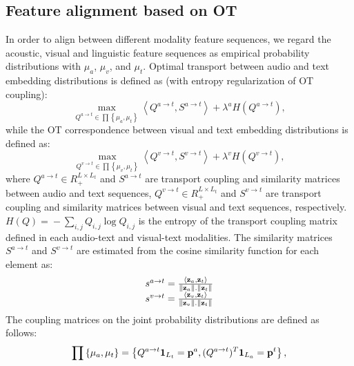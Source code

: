 \documentclass[conference]{IEEEtran}
\begin{document}
\subsection{Feature alignment based on OT}
In order to align between different modality feature sequences, we regard the acoustic, visual and linguistic feature sequences as empirical probability distributions with $\mu_a$, $\mu_v$, and $\mu_t$. Optimal transport between audio and text embedding distributions is defined as (with entropy regularization of OT coupling):
\begin{equation}
	\mathop {\max }\limits_{Q^{a \to t}  \in \prod {\left\{ {\mu_a ,\mu_t } \right\}} } \left\langle {Q^{a \to t} ,S^{a \to t} } \right\rangle  + \lambda ^a H\left( {Q^{a \to t} } \right),
	\label{eq:Qa2t}
\end{equation}
while the OT correspondence between visual and text embedding distributions is defined as:
\begin{equation}
	\mathop {\max }\limits_{Q^{v \to t}  \in \prod {\left\{ {\mu_v ,\mu_t } \right\}} } \left\langle {Q^{v \to t} ,S^{v \to t} } \right\rangle  + \lambda ^v H\left( {Q^{v \to t} } \right),
	\label{eq:Qv2t}
\end{equation}
where ${Q^{a \to t} } \!\in \! R_ + ^{L  \times L_t }$ and ${S^{a \to t} }$ are transport coupling and similarity matrices between audio and text sequences, ${Q^{v \to t} } \!\in \! R_ + ^{L  \times L_t } $ and ${S^{v \to t} }$ are transport coupling and similarity matrices between visual and text sequences, respectively. $H\left( Q \right) \!=\!  - \sum\limits_{i,j} {Q_{i,j} \log Q_{i,j} } $ is the entropy of the transport coupling matrix defined in each audio-text and visual-text modalities. The similarity matrices ${S^{a \to t} }$ and ${S^{v \to t} }$ are estimated from the cosine similarity function for each element as:
\begin{equation}
	\begin{array}{l}
		s^{a \to t}  = \frac{{\left\langle {{\bf z}_a ,{\bf z}_t } \right\rangle }}{{\left\| {{\bf z}_a } \right\|.\left\| {{\bf z}_t } \right\|}} \\ 
		s^{v \to t}  = \frac{{\left\langle {{\bf z}_v ,{\bf z}_t } \right\rangle }}{{\left\| {{\bf z}_v } \right\|.\left\| {{\bf z}_t } \right\|}} \\ 
	\end{array}
\end{equation}
The coupling matrices on the joint probability distributions are defined as follows:
\begin{equation}
	\prod {\left\{ {\mu_a ,\mu_t } \right\}} = \left\{ {Q^{a \to t} {\bf 1}_{L_t }  = \mathbf{p}^a ,(Q^{a \to t} )^T {\bf 1}_{L_a }  = \mathbf{p}^t } \right\}, 
\end{equation}
\end{document}
